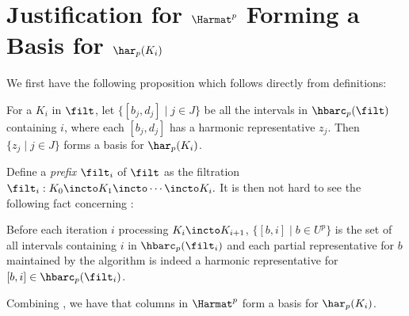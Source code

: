 \section{Justification for $\Harmat^p$ Forming a Basis for $\har_p(K_i)$}\label{sec:harmat-basis}

We first have the following proposition which follows directly from definitions:
\begin{proposition}\label{prop:har-rep-basis}
For a $K_i$ in $\filt$,
let $\{[b_j,d_j]\mid j\in J\}$ 
be all the intervals in $\hbarc_p(\filt)$ containing $i$,
where each $[b_j,d_j]$ has a harmonic representative $z_j$.
Then $\{z_j\mid j\in J\}$ forms a basis for $\har_p(K_i)$.
\end{proposition}

Define a \emph{prefix} $\filt_i$ of $\filt$ as the filtration
$\filt_i: 
K_0 \incto K_1 \incto
\cdots \incto K_i.$
It is then not hard to see the following fact concerning :
\begin{proposition}\label{prop:iter-unpair-to-i}
Before each iteration $i$
processing $K_{i}\incto K_{i+1}$,
$\{[b,i]\mid b\in U^p\}$
is the set of all intervals containing $i$
in $\hbarc_p(\filt_i)$
and each partial representative for $b$
maintained by the algorithm
is indeed a harmonic representative for $[b,i]\in \hbarc_p(\filt_i)$.
\end{proposition}

Combining ,
we have that columns in $\Harmat^p$ form a basis for $\har_p(K_i)$.
